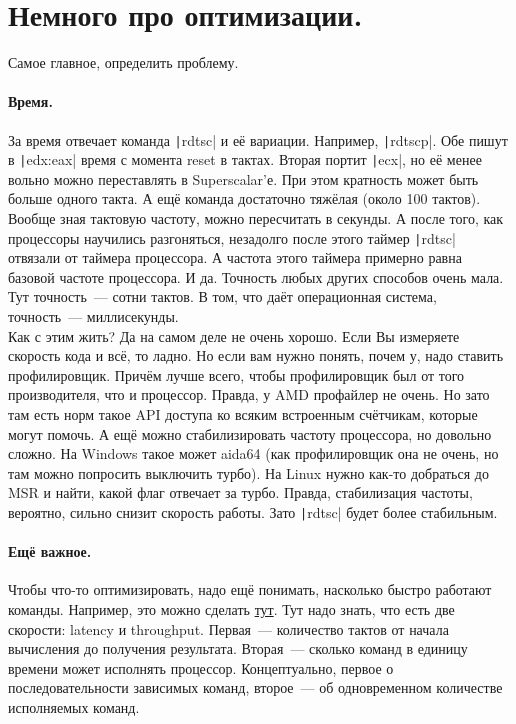 \documentclass{article}
\begin{document}
    \section{Немного про оптимизации.}
    Самое главное, определить проблему.
    \paragraph{Время.}
    За время отвечает команда \texttt|rdtsc| и её вариации. Например, \texttt|rdtscp|. Обе пишут в \texttt|edx:eax| время с момента reset в тактах. Вторая портит \texttt|ecx|, но её менее вольно можно переставлять в Superscalar'е. При этом кратность может быть больше одного такта. А ещё команда достаточно тяжёлая (около 100 тактов). Вообще зная тактовую частоту, можно пересчитать в секунды. А после того, как процессоры научились разгоняться, незадолго после этого таймер \texttt|rdtsc| отвязали от таймера процессора. А частота этого таймера примерно равна базовой частоте процессора. И да. Точность любых других способов очень мала. Тут точность~--- сотни тактов. В том, что даёт операционная система, точность~--- миллисекунды.\\
    Как с этим жить? Да на самом деле не очень хорошо. Если Вы измеряете скорость кода и всё, то ладно. Но если вам нужно понять, почем
    у, надо ставить профилировщик. Причём лучше всего, чтобы профилировщик был от того производителя, что и процессор. Правда, у AMD профайлер не очень. Но зато там есть норм такое API доступа ко всяким встроенным счётчикам, которые могут помочь. А ещё можно стабилизировать частоту процессора, но довольно сложно. На Windows такое может aida64 (как профилировщик она не очень, но там можно попросить выключить турбо). На Linux нужно как-то добраться до MSR и найти, какой флаг отвечает за турбо. Правда, стабилизация частоты, вероятно, сильно снизит скорость работы. Зато \texttt|rdtsc| будет более стабильным.
    \paragraph{Ещё важное.}
    Чтобы что-то оптимизировать, надо ещё понимать, насколько быстро работают команды. Например, это можно сделать \href{https://uops.info/table.html}{тут}. Тут надо знать, что есть две скорости: latency и throughput. Первая~--- количество тактов от начала вычисления до получения результата. Вторая~--- сколько команд в единицу времени может исполнять процессор. Концептуально, первое о последовательности зависимых команд, второе~--- об одновременном количестве исполняемых команд.
\end{document}
